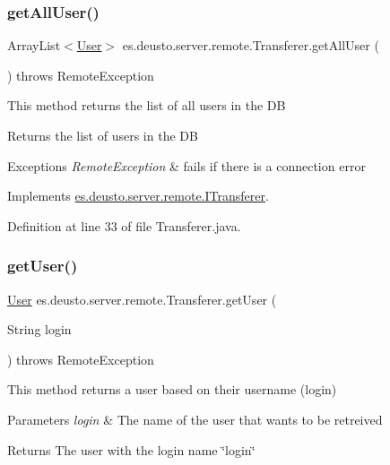 \subsubsection{\texorpdfstring{get\+All\+User()}{getAllUser()}}
{\footnotesize\ttfamily Array\+List$<$\hyperlink{classes_1_1deusto_1_1server_1_1db_1_1data_1_1_user}{User}$>$ es.\+deusto.\+server.\+remote.\+Transferer.\+get\+All\+User (\begin{DoxyParamCaption}{ }\end{DoxyParamCaption}) throws Remote\+Exception}

This method returns the list of all users in the DB \begin{DoxyReturn}{Returns}
the list of users in the DB 
\end{DoxyReturn}

\begin{DoxyExceptions}{Exceptions}
{\em Remote\+Exception} & fails if there is a connection error \\
\hline
\end{DoxyExceptions}


Implements \hyperlink{interfacees_1_1deusto_1_1server_1_1remote_1_1_i_transferer_aec6609427d773f075a78295a97888103}{es.\+deusto.\+server.\+remote.\+I\+Transferer}.



Definition at line 33 of file Transferer.\+java.

\mbox{\label{classes_1_1deusto_1_1server_1_1remote_1_1_transferer_a16976959aeb3080244422aeac061a23b}} 
\subsubsection{\texorpdfstring{get\+User()}{getUser()}}
{\footnotesize\ttfamily \hyperlink{classes_1_1deusto_1_1server_1_1db_1_1data_1_1_user}{User} es.\+deusto.\+server.\+remote.\+Transferer.\+get\+User (\begin{DoxyParamCaption}\item[{String}]{login }\end{DoxyParamCaption}) throws Remote\+Exception}

This method returns a user based on their username (login) 
\begin{DoxyParams}{Parameters}
{\em login} & The name of the user that wants to be retreived \\
\hline
\end{DoxyParams}
\begin{DoxyReturn}{Returns}
The user with the login name \char`\"{}login\char`\"{} 
\end{DoxyReturn}

